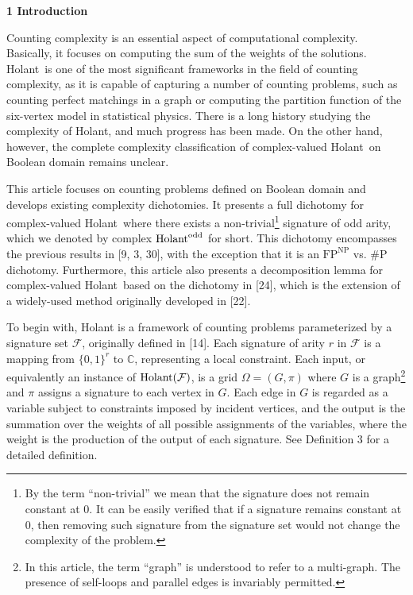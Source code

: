 

\par\medskip\noindent\textbf{
1 Introduction}\par




Counting complexity is an essential aspect of computational complexity. Basically, it focuses on computing the sum of the weights of the solutions.
Holant is one of the most significant frameworks in the field of counting complexity, as it is capable of capturing a number of counting problems, such as counting perfect matchings in a graph or computing the partition function of the six-vertex model in statistical physics. There is a long history studying the complexity of Holant, and much progress has been made. On the other hand, however, the complete complexity classification of complex-valued Holant on Boolean domain remains unclear.\par




This article focuses on counting problems defined on Boolean domain and develops existing complexity dichotomies. It presents a full dichotomy for complex-valued Holant where there exists a non-trivial\footnote{By the term “non-trivial” we mean that the signature does not remain constant at 0. It can be easily verified that if a signature remains constant at 0, then removing such signature from the signature set would not change the complexity of the problem.} signature of odd arity, which we denoted by complex $\textup{{Holant}}^{\text{odd}}$ for short. This dichotomy encompasses the previous results in [9, 3, 30], with the exception that it is an $\text{FP}^{\text{NP}}$ vs. \#P dichotomy. Furthermore, this article also presents a decomposition lemma for complex-valued Holant based on the dichotomy in [24], which is the extension of a widely-used method originally developed in [22].\par




To begin with, Holant is a framework of counting problems parameterized by a signature set $\mathcal{F}$, originally defined in [14]. Each signature of arity $r$ in $\mathcal{F}$ is a mapping from $\{0,1\}^{r}$ to $\mathbb{C}$, representing a local constraint. Each input, or equivalently an instance of $\textup{{Holant}}(\mathcal{F})$, is a grid $\Omega=(G,\pi)$ where $G$ is a graph\footnote{In this article, the term “graph” is understood to refer to a multi-graph. The presence of self-loops and parallel edges is invariably permitted.} and $\pi$ assigns a signature to each vertex in $G$. Each edge in $G$ is regarded as a variable subject to constraints imposed by incident vertices, and the output is the summation over the weights of all possible assignments of the variables, where the weight is the production of the output of each signature. See Definition 3 for a detailed definition.\par




